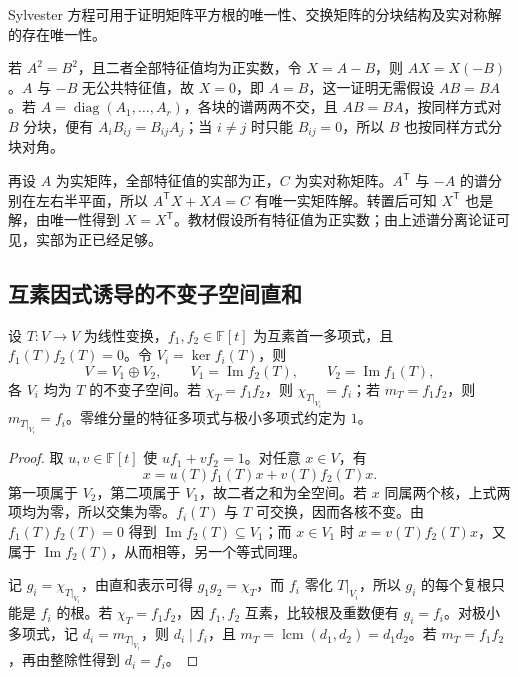 \begin{example}
Sylvester 方程可用于证明矩阵平方根的唯一性、交换矩阵的分块结构及实对称解的存在唯一性。
\end{example}
\begin{solve}
若 $A^2=B^2$，且二者全部特征值均为正实数，令 $X=A-B$，则 $AX=X(-B)$。$A$ 与 $-B$ 无公共特征值，故 $X=0$，即 $A=B$，这一证明无需假设 $AB=BA$。若 $A=\operatorname{diag}(A_1,\ldots,A_r)$，各块的谱两两不交，且 $AB=BA$，按同样方式对 $B$ 分块，便有 $A_iB_{ij}=B_{ij}A_j$；当 $i\ne j$ 时只能 $B_{ij}=0$，所以 $B$ 也按同样方式分块对角。

再设 $A$ 为实矩阵，全部特征值的实部为正，$C$ 为实对称矩阵。$A^{\mathsf T}$ 与 $-A$ 的谱分别在左右半平面，所以 $A^{\mathsf T}X+XA=C$ 有唯一实矩阵解。转置后可知 $X^{\mathsf T}$ 也是解，由唯一性得到 $X=X^{\mathsf T}$。教材假设所有特征值为正实数；由上述谱分离论证可见，实部为正已经足够。
\end{solve}

\subsection{互素因式诱导的不变子空间直和}

\begin{theorem}
\label{thm:xie-ex-eig-coprime-decomposition}
设 $T\colon V\to V$ 为线性变换，$f_1,f_2\in\mathbb F[t]$ 为互素首一多项式，且 $f_1(T)f_2(T)=0$。令 $V_i=\ker f_i(T)$，则
\begin{equation}
V=V_1\oplus V_2,\qquad
V_1=\operatorname{Im}f_2(T),\qquad
V_2=\operatorname{Im}f_1(T),
\label{eq:xie-ex-eig-coprime-decomposition}
\end{equation}
各 $V_i$ 均为 $T$ 的不变子空间。若 $\chi_T=f_1f_2$，则 $\chi_{T|_{V_i}}=f_i$；若 $m_T=f_1f_2$，则 $m_{T|_{V_i}}=f_i$。零维分量的特征多项式与极小多项式约定为 $1$。
\end{theorem}
\begin{proof}
取 $u,v\in\mathbb F[t]$ 使 $uf_1+vf_2=1$。对任意 $x\in V$，有
\[
x=u(T)f_1(T)x+v(T)f_2(T)x.
\]
第一项属于 $V_2$，第二项属于 $V_1$，故二者之和为全空间。若 $x$ 同属两个核，上式两项均为零，所以交集为零。$f_i(T)$ 与 $T$ 可交换，因而各核不变。由 $f_1(T)f_2(T)=0$ 得到 $\operatorname{Im}f_2(T)\subseteq V_1$；而 $x\in V_1$ 时 $x=v(T)f_2(T)x$，又属于 $\operatorname{Im}f_2(T)$，从而相等，另一个等式同理。

记 $g_i=\chi_{T|_{V_i}}$，由直和表示可得 $g_1g_2=\chi_T$，而 $f_i$ 零化 $T|_{V_i}$，所以 $g_i$ 的每个复根只能是 $f_i$ 的根。若 $\chi_T=f_1f_2$，因 $f_1,f_2$ 互素，比较根及重数便有 $g_i=f_i$。对极小多项式，记 $d_i=m_{T|_{V_i}}$，则 $d_i\mid f_i$，且 $m_T=\operatorname{lcm}(d_1,d_2)=d_1d_2$。若 $m_T=f_1f_2$，再由整除性得到 $d_i=f_i$。
\end{proof}

